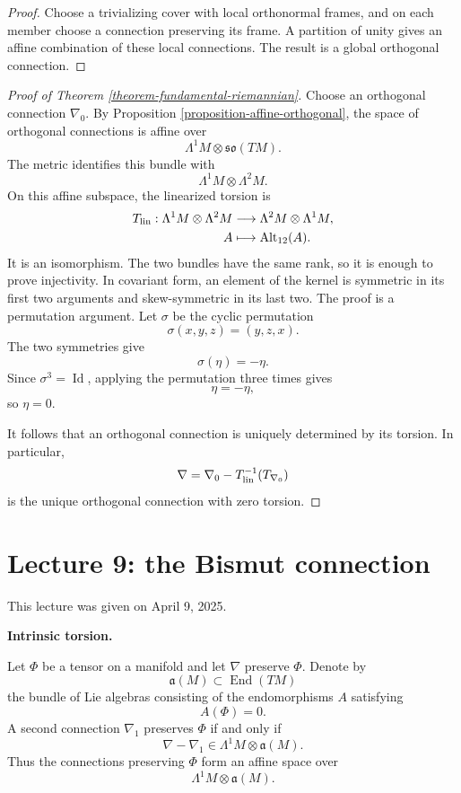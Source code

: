 \begin{proof}
Choose a trivializing cover with local
orthonormal frames, and on each member choose
a connection preserving its frame. A
partition of unity gives an affine
combination of these local connections. The
result is a global orthogonal connection.
\end{proof}

\begin{proof}[Proof of Theorem
\ref{theorem-fundamental-riemannian}]
Choose an orthogonal connection $\nabla_0$.
By Proposition
\ref{proposition-affine-orthogonal}, the
space of orthogonal connections is affine
over
$$
\Lambda^1M\otimes\mathfrak{so}(TM).
$$
The metric identifies this bundle with
$$
\Lambda^1M\otimes\Lambda^2M.
$$
On this affine subspace, the linearized
torsion is
$$
\begin{aligned}
T_{\rm lin}:\Lambda^1M\otimes\Lambda^2M
&\longrightarrow
\Lambda^2M\otimes\Lambda^1M,\\
A&\longmapsto
\operatorname{Alt}_{12}(A).
\end{aligned}
$$
It is an isomorphism. The two bundles have
the same rank, so it is enough to prove
injectivity. In covariant form, an element
of the kernel is symmetric in its first two
arguments and skew-symmetric in its last
two. The proof is a permutation argument.
Let $\sigma$ be the cyclic permutation
$$
\sigma(x,y,z)=(y,z,x).
$$
The two symmetries give
$$
\sigma(\eta)=-\eta.
$$
Since $\sigma^3=\operatorname{Id}$, applying
the permutation three times gives
$$
\eta=-\eta,
$$
so $\eta=0$.

It follows that an orthogonal connection is
uniquely determined by its torsion. In
particular,
$$
\nabla
=\nabla_0
-T_{\rm lin}^{-1}(T_{\nabla_0})
$$
is the unique orthogonal connection with
zero torsion.
\end{proof}

\section{Lecture 9: the Bismut
connection}
\label{section-lecture-nine-bismut}

\noindent
This lecture was given on April 9, 2025.

\medskip\noindent
{\bf Intrinsic torsion.}

Let $\Phi$ be a tensor on a manifold and
let $\nabla$ preserve $\Phi$. Denote by
$$
\mathfrak{a}(M)
\subset\operatorname{End}(TM)
$$
the bundle of Lie algebras consisting of
the endomorphisms $A$ satisfying
$$
A(\Phi)=0.
$$
A second connection $\nabla_1$ preserves
$\Phi$ if and only if
$$
\nabla-\nabla_1
\in\Lambda^1M\otimes\mathfrak{a}(M).
$$
Thus the connections preserving $\Phi$
form an affine space over
$$
\Lambda^1M\otimes\mathfrak{a}(M).
$$


